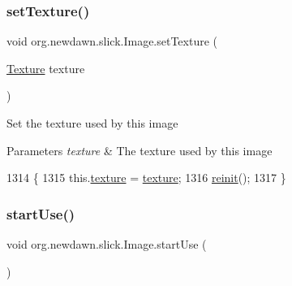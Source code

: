 \subsubsection{\texorpdfstring{set\+Texture()}{setTexture()}}
{\footnotesize\ttfamily void org.\+newdawn.\+slick.\+Image.\+set\+Texture (\begin{DoxyParamCaption}\item[{\mbox{\hyperlink{interfaceorg_1_1newdawn_1_1slick_1_1opengl_1_1_texture}{Texture}}}]{texture }\end{DoxyParamCaption})\hspace{0.3cm}{\ttfamily [inline]}}

Set the texture used by this image


\begin{DoxyParams}{Parameters}
{\em texture} & The texture used by this image \\
\hline
\end{DoxyParams}

\begin{DoxyCode}
1314                                             \{
1315         this.\mbox{\hyperlink{classorg_1_1newdawn_1_1slick_1_1_image_a9fd9ddb21247305c83ac4e37d9d51f79}{texture}} = \mbox{\hyperlink{classorg_1_1newdawn_1_1slick_1_1_image_a9fd9ddb21247305c83ac4e37d9d51f79}{texture}};
1316         \mbox{\hyperlink{classorg_1_1newdawn_1_1slick_1_1_image_ac959cc9bd3258690a9eb51359df1f6df}{reinit}}();
1317     \}
\end{DoxyCode}
\mbox{\label{classorg_1_1newdawn_1_1slick_1_1_image_a6c7c3f31d0a0a4c73026c8dac8dec7d2}} 
\subsubsection{\texorpdfstring{start\+Use()}{startUse()}}
{\footnotesize\ttfamily void org.\+newdawn.\+slick.\+Image.\+start\+Use (\begin{DoxyParamCaption}{ }\end{DoxyParamCaption})\hspace{0.3cm}{\ttfamily [inline]}}

